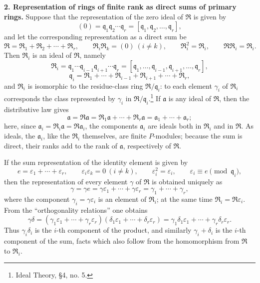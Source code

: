 \documentclass[11pt]{article}
\begin{document}
\textbf{2. Representation of rings of finite rank as direct sums of primary rings.} Suppose that the representation of the zero ideal of $\mathfrak R$ is given by
\[
   (0)=\mathfrak q_1\mathfrak q_2\cdots\mathfrak q_r
       =[\mathfrak q_1,\mathfrak q_2,\ldots,\mathfrak q_r],
\]
and let the corresponding representation as a direct sum be
\[
   \mathfrak R=\mathfrak R_1+\mathfrak R_2+\cdots+\mathfrak R_r,
   \qquad
   \mathfrak R_i\mathfrak R_k=(0)\ (i\ne k),
   \qquad
   \mathfrak R_i^2=\mathfrak R_i,
   \qquad
   \mathfrak R\mathfrak R_i=\mathfrak R_i .
\]
Then $\mathfrak R_i$ is an ideal of $\mathfrak R$, namely
\[
   \mathfrak R_i
   =\mathfrak q_1\cdots\mathfrak q_{i-1}\mathfrak q_{i+1}\cdots\mathfrak q_r
   =[\mathfrak q_1,\ldots,\mathfrak q_{i-1},\mathfrak q_{i+1},\ldots,\mathfrak q_r],
\]
\[
   \mathfrak q_i=\mathfrak R_1+\cdots+\mathfrak R_{i-1}+\mathfrak R_{i+1}+\cdots+\mathfrak R_r,
\]
and $\mathfrak R_i$ is isomorphic to the residue-class ring $\mathfrak R/\mathfrak q_i$: to each element $\gamma_i$ of $\mathfrak R_i$ corresponds the class represented by $\gamma_i$ in $\mathfrak R/\mathfrak q_i$.\footnote{Ideal Theory, \S 4, no. 5.} If $\mathfrak a$ is any ideal of $\mathfrak R$, then the distributive law gives
\[
   \mathfrak a=\mathfrak R\mathfrak a
   =\mathfrak R_1\mathfrak a+\cdots+\mathfrak R_r\mathfrak a
   =\mathfrak a_1+\cdots+\mathfrak a_r;
\]
here, since $\mathfrak a_i=\mathfrak R_i\mathfrak a=\mathfrak R\mathfrak a_i$, the components $\mathfrak a_i$ are ideals both in $\mathfrak R_i$ and in $\mathfrak R$. As ideals, the $\mathfrak a_i$, like the $\mathfrak R_i$ themselves, are finite $P$-modules; because the sum is direct, their ranks add to the rank of $\mathfrak a$, respectively of $\mathfrak R$.

If the sum representation of the identity element is given by
\[
   e=\varepsilon_1+\cdots+\varepsilon_r,
   \qquad
   \varepsilon_i\varepsilon_k=0\ (i\ne k),
   \qquad
   \varepsilon_i^2=\varepsilon_i,
   \qquad
   \varepsilon_i\equiv e\pmod{\mathfrak q_i},
\]
then the representation of every element $\gamma$ of $\mathfrak R$ is obtained uniquely as
\[
   \gamma=\gamma e=\gamma\varepsilon_1+\cdots+\gamma\varepsilon_r
   =\gamma_1+\cdots+\gamma_r,
\]
where the component $\gamma_i=\gamma\varepsilon_i$ is an element of $\mathfrak R_i$; at the same time $\mathfrak R_i=\mathfrak R\varepsilon_i$. From the ``orthogonality relations'' one obtains
\[
   \gamma\delta=(\gamma_1\varepsilon_1+\cdots+\gamma_r\varepsilon_r)
      (\delta_1\varepsilon_1+\cdots+\delta_r\varepsilon_r)
   =\gamma_1\delta_1\varepsilon_1+\cdots+\gamma_r\delta_r\varepsilon_r.
\]
Thus $\gamma_i\delta_i$ is the $i$-th component of the product, and similarly $\gamma_i+\delta_i$ is the $i$-th component of the sum, facts which also follow from the homomorphism from $\mathfrak R$ to $\mathfrak R_i$.
\end{document}
